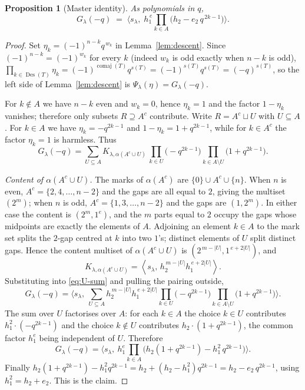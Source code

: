 \documentclass[11pt]{article}
\newtheorem{proposition}{Proposition}
\theoremstyle{definition}
\DeclareMathOperator{\Des}{Des}
\DeclareMathOperator{\comaj}{comaj}
\newcommand{\la}{\lambda}
\newcommand{\inner}[1]{\left\langle #1 \right\rangle}
\begin{document}
\begin{proposition}[Master identity]\label{prop:master}
As polynomials in $q$,
\[
  G_\la(-q)\;=\;\Big\langle s_\la,\; h_1^{\,e}\prod_{k\in A}\big(h_2-e_2\,q^{\,2k-1}\big)\Big\rangle .
\]
\end{proposition}

\begin{proof}
Set $\eta_k=(-1)^{n-k}q^{\,w_k}$ in Lemma~\ref{lem:descent}. Since
$(-1)^{n-k}=(-1)^{w_k}$ for every $k$ (indeed $w_k$ is odd exactly when $n-k$ is
odd), $\prod_{k\in\Des(T)}\eta_k=(-1)^{\comaj(T)}q^{s(T)}=(-1)^{s(T)}q^{s(T)}=(-q)^{s(T)}$,
so the left side of Lemma~\ref{lem:descent} is $\Psi_\la(\eta)=G_\la(-q)$.

For $k\notin A$ we have $n-k$ even and $w_k=0$, hence $\eta_k=1$ and the factor
$1-\eta_k$ vanishes; therefore only subsets $R\supseteq A^c$ contribute. Write
$R=A^c\sqcup U$ with $U\subseteq A$. For $k\in A$ we have $\eta_k=-q^{2k-1}$ and
$1-\eta_k=1+q^{2k-1}$, while for $k\in A^c$ the factor $\eta_k=1$ is harmless. Thus
\begin{equation}\label{eq:U-sum}
  G_\la(-q)=\sum_{U\subseteq A}K_{\la,\alpha(A^c\cup U)}\,
            \prod_{k\in U}\big(-q^{2k-1}\big)\prod_{k\in A\setminus U}\big(1+q^{2k-1}\big).
\end{equation}

\emph{Content of $\alpha(A^c\cup U)$.} The marks of $\alpha(A^c)$ are
$\{0\}\cup A^c\cup\{n\}$. When $n$ is even, $A^c=\{2,4,\dots,n-2\}$ and the gaps are
all equal to $2$, giving the multiset $(2^m)$; when $n$ is odd,
$A^c=\{1,3,\dots,n-2\}$ and the gaps are $(1,2^m)$. In either case the content is
$(2^m,1^e)$, and the $m$ parts equal to $2$ occupy the gaps whose midpoints are
exactly the elements of $A$. Adjoining an element $k\in A$ to the mark set splits the
$2$-gap centred at $k$ into two $1$'s; distinct elements of $U$ split distinct gaps.
Hence the content multiset of $\alpha(A^c\cup U)$ is $(2^{\,m-|U|},1^{\,e+2|U|})$, and
\[
  K_{\la,\alpha(A^c\cup U)}=\inner{s_\la,\,h_2^{\,m-|U|}h_1^{\,e+2|U|}}.
\]
Substituting into \eqref{eq:U-sum} and pulling the pairing outside,
\[
  G_\la(-q)=\Big\langle s_\la,\ \sum_{U\subseteq A}
    h_2^{\,m-|U|}h_1^{\,e+2|U|}\prod_{k\in U}\big(-q^{2k-1}\big)
    \prod_{k\in A\setminus U}\big(1+q^{2k-1}\big)\Big\rangle .
\]
The sum over $U$ factorises over $A$: for each $k\in A$ the choice $k\in U$ contributes
$h_1^{2}\cdot(-q^{2k-1})$ and the choice $k\notin U$ contributes
$h_2\cdot(1+q^{2k-1})$, the common factor $h_1^{e}$ being independent of $U$. Therefore
\[
  G_\la(-q)=\Big\langle s_\la,\ h_1^{e}\prod_{k\in A}
     \big(h_2(1+q^{2k-1})-h_1^2\,q^{2k-1}\big)\Big\rangle .
\]
Finally $h_2(1+q^{2k-1})-h_1^2q^{2k-1}=h_2+(h_2-h_1^2)q^{2k-1}=h_2-e_2\,q^{2k-1}$, using
$h_1^2=h_2+e_2$. This is the claim.
\end{proof}
\end{document}
